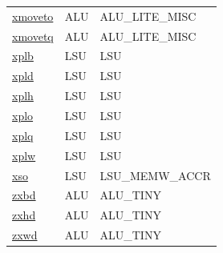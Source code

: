 \begin{small}
\begin{longtable}[l]{l l l}
\hyperlink{lvx.xmoveto}{xmoveto} & ALU & ALU\_LITE\_MISC \\ 
\hyperlink{lvx.xmovetq}{xmovetq} & ALU & ALU\_LITE\_MISC \\ 
\hyperlink{lvx.xplb}{xplb} & LSU & LSU \\ 
\hyperlink{lvx.xpld}{xpld} & LSU & LSU \\ 
\hyperlink{lvx.xplh}{xplh} & LSU & LSU \\ 
\hyperlink{lvx.xplo}{xplo} & LSU & LSU \\ 
\hyperlink{lvx.xplq}{xplq} & LSU & LSU \\ 
\hyperlink{lvx.xplw}{xplw} & LSU & LSU \\ 
\hyperlink{lvx.xso}{xso} & LSU & LSU\_MEMW\_ACCR \\ 
\hyperlink{lvx.zxbd}{zxbd} & ALU & ALU\_TINY \\ 
\hyperlink{lvx.zxhd}{zxhd} & ALU & ALU\_TINY \\ 
\hyperlink{lvx.zxwd}{zxwd} & ALU & ALU\_TINY \\ 
\end{longtable}\end{small}
